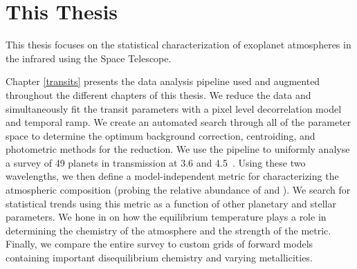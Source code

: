 

\section{This Thesis} %

This thesis focuses on the statistical characterization of exoplanet atmospheres in the infrared using the \spitzer Space Telescope.

Chapter \ref{transits} presents the data analysis pipeline used and augmented throughout the different chapters of this thesis. We reduce the data and simultaneously fit the transit parameters \citep[using Batman;][]{Kreidberg2015} with a pixel level decorrelation model and temporal ramp. We create an automated search through all of the parameter space to determine the optimum background correction, centroiding, and photometric methods for the reduction. We use the pipeline to uniformly analyse a survey of 49 planets in transmission at 3.6 and 4.5~\um. Using these two wavelengths, we then define a model-independent metric for characterizing the atmospheric composition (probing the relative abundance of  and ). We search for statistical trends using this \spitzer metric as a function of other planetary and stellar parameters. We hone in on how the equilibrium temperature plays a role in determining the chemistry of the atmosphere and the strength of the \spitzer metric. Finally, we compare the entire survey to custom grids of forward models containing important disequilibrium chemistry and varying metallicities.

